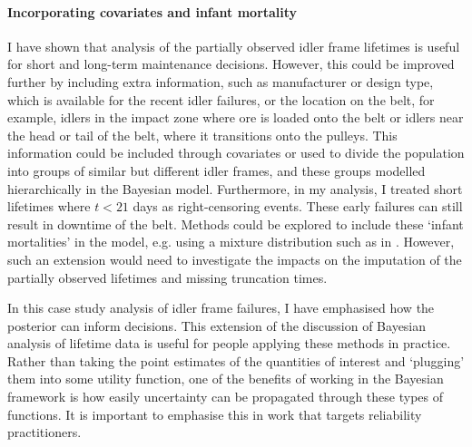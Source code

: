 \paragraph*{Incorporating covariates and infant mortality}
I have shown that analysis of the partially observed idler frame lifetimes is useful for short and long-term maintenance decisions. However, this could be improved further by including extra information, such as manufacturer or design type, which is available for the recent idler failures, or the location on the belt, for example, idlers in the impact zone where ore is loaded onto the belt or idlers near the head or tail of the belt, where it transitions onto the pulleys. This information could be included through covariates or used to divide the population into groups of similar but different idler frames, and these groups modelled hierarchically in the Bayesian model. Furthermore, in my analysis, I treated short lifetimes where $t < 21$ days as right-censoring events. These early failures can still result in downtime of the belt. Methods could be explored to include these `infant mortalities' in the model, e.g. using a mixture distribution such as in \citet{mittman2013}. However, such an extension would need to investigate the impacts on the imputation of the partially observed lifetimes and missing truncation times.

In this case study analysis of idler frame failures, I have emphasised how the posterior can inform decisions. This extension of the discussion of Bayesian analysis of lifetime data is useful for people applying these methods in practice. Rather than taking the point estimates of the quantities of interest and `plugging' them into some utility function, one of the benefits of working in the Bayesian framework is how easily uncertainty can be propagated through these types of functions. It is important to emphasise this in work that targets reliability practitioners.